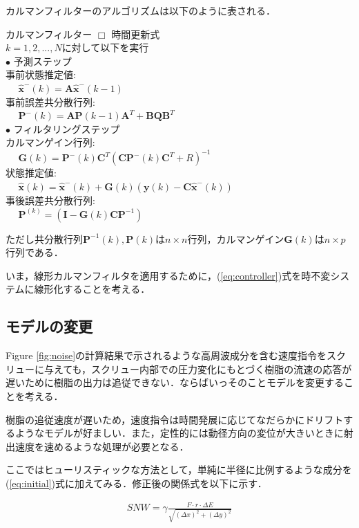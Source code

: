 \documentclass[twocolumn,oneside,a4paper]{article}
\begin{document}
カルマンフィルターのアルゴリズムは以下のように表される．
  \begin{itembox}[l]{カルマンフィルター}
    $\Box$ 時間更新式\\
    $k=1,2,...,N$に対して以下を実行\\
	$\bullet$ 予測ステップ\\
	事前状態推定値: \\
	$\:\:\:\:\:\: \hat{\bm{x}}^{-}(k) = \bm{A}\hat{\bm{x}}^{-}(k-1)$\\
	事前誤差共分散行列: \\
	$\:\:\:\:\:\: \bm{P}^{-}(k)=\bm{A}\bm{P}(k-1)\bm{A}^{T}+\bm{BQ}\bm{B}^T$\\		
	$\bullet$ フィルタリングステップ\\
	カルマンゲイン行列: \\
	$\:\:\:\:\:\: \bm{G}(k)=\bm{P}^{-}(k)\bm{C}^T(\bm{C}\bm{P}^{-}(k)\bm{C}^{T}+R)^{-1}$\\
	状態推定値: \\
	$\:\:\:\:\:\: \hat{\bm{x}}(k) = \hat{\bm{x}}^{-}(k) + \bm{G}(k)(\bm{y}(k)-\bm{C}\hat{\bm{x}}^{-}(k))$\\
	事後誤差共分散行列: \\
	$\:\:\:\:\:\: \bm{P}^(k)=(\bm{I}-\bm{G}(k)\bm{C}\bm{P}^{-1})$
  \end{itembox}

ただし共分散行列$\bm{P}^{-1}(k), \bm{P}(k)$は$n \times n$行列，カルマンゲイン$\bm{G}(k)$は$n \times p$行列である．

いま，線形カルマンフィルタを適用するために，(\ref{eq:controller})式を時不変システムに線形化することを考える．


\subsection{モデルの変更}
Figure \ref{fig:noise}の計算結果で示されるような高周波成分を含む速度指令をスクリューに与えても，スクリュー内部での圧力変化にもとづく樹脂の流速の応答が遅いために樹脂の出力は追従できない．ならばいっそのことモデルを変更することを考える．

樹脂の追従速度が遅いため，速度指令は時間発展に応じてなだらかにドリフトするようなモデルが好ましい．また，定性的には動径方向の変位が大きいときに射出速度を速めるような処理が必要となる．

ここではヒューリスティックな方法として，単純に半径に比例するような成分を(\ref{eq:initial})式に加えてみる．修正後の関係式を以下に示す．

\begin{eqnarray}\label{eq:fix}
  SNW = \gamma \frac{F\cdot r\cdot  \Delta E}{\sqrt{(\Delta x)^2+(\Delta y)^2}} 
\end{eqnarray}
\end{document}
